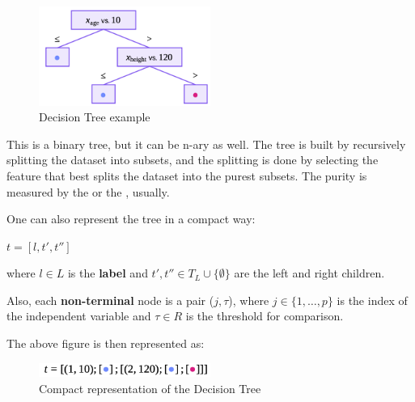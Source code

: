 \begin{center}
    \begin{figure}[H]
        \centering
        \includegraphics[width=0.5\textwidth]{assets/fig11.png}
        \caption{Decision Tree example}
    \end{figure}
\end{center}

This is a binary tree, but it can be n-ary as well. The tree is built by recursively splitting the dataset into subsets, and the splitting is done by selecting the feature that best splits the dataset into the purest subsets. The purity is measured by the  or the , usually.

One can also represent the tree in a compact way:
\begin{center}
    $t = [l, t', t'']$
\end{center}

where $l \in L$ is the \textbf{label} and $t', t'' \in T_L \cup \{\emptyset\}$ are the left and right children.

Also, each \textbf{non-terminal} node is a pair ($j, \tau$), where $j \in \{1, \dots, p\}$ is the index of the independent variable and $\tau \in R$ is the threshold for comparison.

The above figure is then represented as:

\begin{center}
    \begin{figure}[H]
        \centering
        \includegraphics[width=0.5\textwidth]{assets/fig12.png}
        \caption{Compact representation of the Decision Tree}
    \end{figure}
\end{center}
